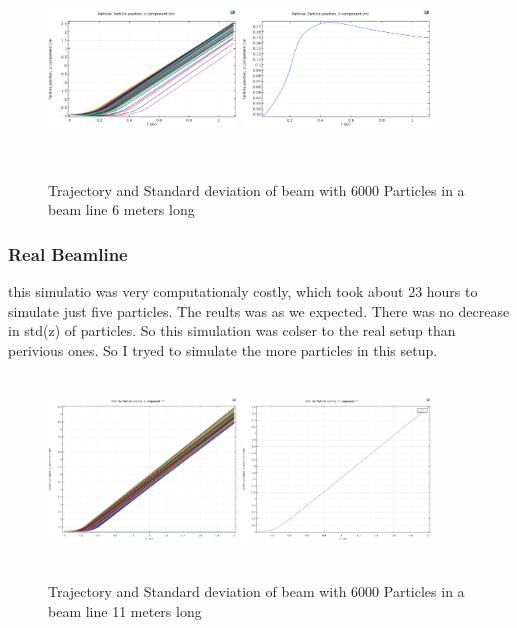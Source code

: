 \documentclass{article}
\begin{document}
\begin{figure}[h]
\centering
\includegraphics[width=50mm, height=50mm]{sim-in-100-long}
\includegraphics[width=50mm, height=50mm]{sim-std-100-long}
\caption{Trajectory and Standard deviation of beam with 6000 Particles in a beam line 6 meters long }
\end{figure}
 
\subsubsection{Real Beamline}
this simulatio was very computationaly costly, which took about 23 hours to simulate just five particles. The reults was as we expected. There was no decrease in std(z) of particles. So this simulation was colser to the real setup than perivious ones. So I tryed to simulate the more particles in this setup.

\begin{figure}[h]
\centering
\includegraphics[width=50mm, height=50mm]{sim-in-100-11met}
\includegraphics[width=50mm, height=50mm]{sim-std-100-11met}
\caption{Trajectory and Standard deviation of beam with 6000 Particles in a beam line 11 meters long }
\end{figure}
\end{document}
